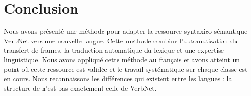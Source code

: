 \section*{Conclusion}

Nous avons présenté une méthode pour adapter la ressource syntaxico-sémantique
VerbNet vers une nouvelle langue. Cette méthode combine l'automatisation du
transfert de frames, la traduction automatique du lexique et une expertise
linguistique. Nous avons appliqué cette méthode au français et avons atteint un
point où cette ressource est validée et le travail systématique sur chaque
classe est en cours. Nous reconnaissons les différences qui existent entre les
langues : la structure de \verbenet{} n'est pas exactement celle de VerbNet.


